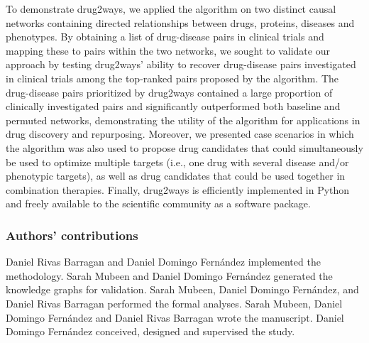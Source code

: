 To demonstrate drug2ways, we applied the algorithm on two distinct causal networks containing directed relationships between drugs, proteins, diseases and phenotypes. By obtaining a list of drug-disease pairs in clinical trials and mapping these to pairs within the two networks, we sought to validate our approach by testing drug2ways' ability to recover drug-disease pairs investigated in clinical trials among the top-ranked pairs proposed by the algorithm. The drug-disease pairs prioritized by drug2ways contained a large proportion of clinically investigated pairs and significantly outperformed both baseline and permuted networks, demonstrating the utility of the algorithm for applications in drug discovery and repurposing. Moreover, we presented case scenarios in which the algorithm was also used to propose drug candidates that could simultaneously be used to optimize multiple targets (i.e., one drug with several disease and/or phenotypic targets), as well as drug candidates that could be used together in combination therapies. Finally, drug2ways is efficiently implemented in Python and freely available to the scientific community as a software package.

\subsubsection{Authors' contributions}

Daniel Rivas Barragan and Daniel Domingo Fernández implemented the methodology. Sarah Mubeen and Daniel Domingo Fernández generated the knowledge graphs for validation. Sarah Mubeen, Daniel Domingo Fernández, and Daniel Rivas Barragan performed the formal analyses. Sarah Mubeen, Daniel Domingo Fernández and Daniel Rivas Barragan wrote the manuscript. Daniel Domingo Fernández conceived, designed and supervised the study.

